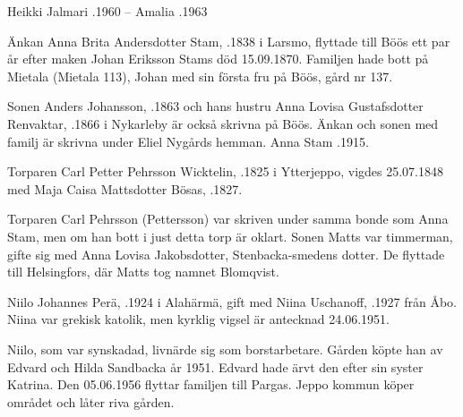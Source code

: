 Heikki Jalmari .1960  --  Amalia .1963


Änkan Anna Brita Andersdotter Stam, .1838 i Larsmo, flyttade till Böös ett par år efter maken Johan Eriksson Stams död 15.09.1870. Familjen hade bott på Mietala (Mietala 113), Johan med sin första fru på Böös, gård nr 137.

Sonen Anders Johansson, .1863 och hans hustru Anna Lovisa Gustafsdotter Renvaktar, .1866 i Nykarleby är också skrivna på Böös. Änkan och sonen med familj är skrivna under Eliel Nygårds hemman. Anna Stam .1915.


Torparen Carl Petter Pehrsson Wicktelin, .1825 i Ytterjeppo, vigdes 25.07.1848 med Maja Caisa Mattsdotter Bösas, .1827.
\begin{jhchildren}
  \item {}
  \item {}
  \item {}
  \item {}
  \item {}
  \item {}
\end{jhchildren}
Torparen Carl Pehrsson (Pettersson) var skriven under samma bonde som Anna Stam, men om han bott i just detta torp är oklart. Sonen 			Matts var timmerman, gifte sig med Anna Lovisa Jakobsdotter, Stenbacka-smedens dotter. De flyttade till  Helsingfors, där Matts tog 			namnet Blomqvist.




Niilo Johannes Perä, .1924 i Alahärmä, gift med Niina Uschanoff, .1927 från Åbo. Niina var grekisk katolik, men kyrklig vigsel är antecknad 24.06.1951.
\begin{jhchildren}
  \item {}
  \item {}
  \item {}
\end{jhchildren}
Niilo, som var synskadad, livnärde sig som borstarbetare. Gården köpte han av Edvard och Hilda Sandbacka år 1951. Edvard hade ärvt den efter sin syster Katrina. Den 05.06.1956 flyttar familjen till Pargas. Jeppo kommun köper området och låter riva gården.


